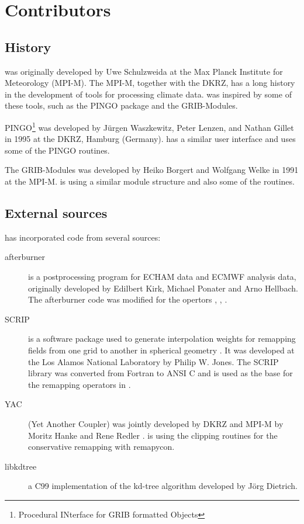 \chapter{Contributors}

\section{History}

{\CDO} was originally developed by Uwe Schulzweida at the Max Planck Institute for Meteorology (MPI-M).
The MPI-M, together with the DKRZ, has a long history in the development of tools for processing climate data.
{\CDO} was inspired by some of these tools, such as the PINGO package and the GRIB-Modules.

PINGO\footnote{Procedural INterface for GRIB formatted Objects} was developed by J\"urgen Waszkewitz,
 Peter Lenzen, and Nathan Gillet in 1995 at the DKRZ, Hamburg (Germany).
{\CDO} has a similar user interface and uses some of the PINGO routines.

The GRIB-Modules was developed by Heiko Borgert and Wolfgang Welke in 1991 at the MPI-M.
{\CDO} is using a similar module structure and also some of the routines.

\section{External sources}

{\CDO} has incorporated code from several sources:

\begin{description}
\item[afterburner] is a postprocessing program for ECHAM data and ECMWF analysis data,
originally developed by Edilbert Kirk, Michael Ponater and Arno Hellbach.
The afterburner code was modified for the {\CDO} opertors  {},  {},  {}.

\item[SCRIP] is a software package used to generate interpolation weights for remapping
fields from one grid to another in spherical geometry \cite{SCRIP}.
It was developed at the Los Alamos National Laboratory by Philip W. Jones.
The SCRIP library was converted from Fortran to ANSI C and is used as
the base for the remapping operators in {\CDO}.

\item[YAC] (Yet Another Coupler) was jointly developed by DKRZ and MPI-M by Moritz Hanke and Rene Redler \cite{YAC}.
{\CDO} is using the clipping routines for the conservative remapping with remapycon.

\item[libkdtree] a C99 implementation of the kd-tree algorithm developed by J\"org Dietrich.
\end{description}

